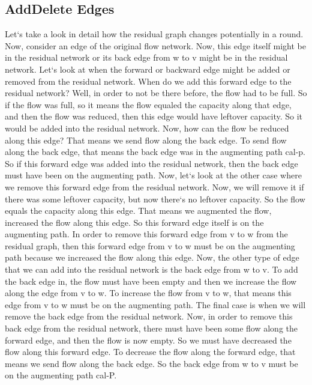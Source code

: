 \subsection{AddDelete Edges}
Let`s take a look in detail how the residual graph changes potentially in a round.
Now, consider an edge of the original flow network.
Now, this edge itself might be in the residual network or its back edge from w to v might be in the residual network.
Let`s look at when the forward or backward edge might be added or removed from the residual network.
When do we add this forward edge to the residual network? Well, in order to not be there before, the flow had to be full.
So if the flow was full, so it means the flow equaled the capacity along that edge, and then the flow was reduced, then this edge would have leftover capacity.
So it would be added into the residual network.
Now, how can the flow be reduced along this edge? That means we send flow along the back edge.
To send flow along the back edge, that means the back edge was in the augmenting path cal-p.
So if this forward edge was added into the residual network, then the back edge must have been on the augmenting path.
Now, let`s look at the other case where we remove this forward edge from the residual network.
Now, we will remove it if there was some leftover capacity, but now there`s no leftover capacity.
So the flow equals the capacity along this edge.
That means we augmented the flow, increased the flow along this edge.
So this forward edge itself is on the augmenting path.
In order to remove this forward edge from v to w from the residual graph, then this forward edge from v to w must be on the augmenting path because we increased the flow along this edge.
Now, the other type of edge that we can add into the residual network is the back edge from w to v.
To add the back edge in, the flow must have been empty and then we increase the flow along the edge from v to w.
To increase the flow from v to w, that means this edge from v to w must be on the augmenting path.
The final case is when we will remove the back edge from the residual network.
Now, in order to remove this back edge from the residual network, there must have been some flow along the forward edge, and then the flow is now empty.
So we must have decreased the flow along this forward edge.
To decrease the flow along the forward edge, that means we send flow along the back edge.
So the back edge from w to v must be on the augmenting path cal-P\@.

